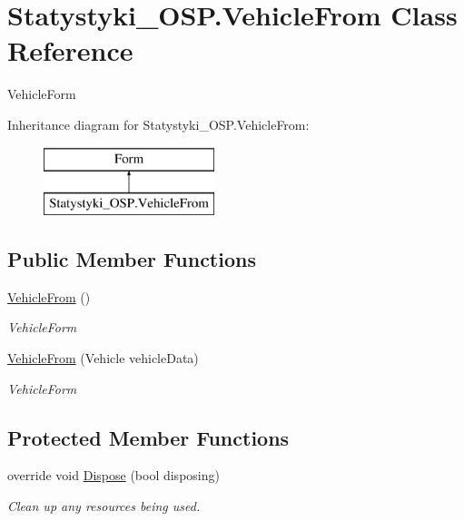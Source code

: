 \hypertarget{class_statystyki___o_s_p_1_1_vehicle_from}{}\section{Statystyki\+\_\+\+O\+S\+P.\+Vehicle\+From Class Reference}
\label{class_statystyki___o_s_p_1_1_vehicle_from}


Vehicle\+Form  


Inheritance diagram for Statystyki\+\_\+\+O\+S\+P.\+Vehicle\+From\+:\begin{figure}[H]
\begin{center}
\leavevmode
\includegraphics[height=2.000000cm]{class_statystyki___o_s_p_1_1_vehicle_from}
\end{center}
\end{figure}
\subsection*{Public Member Functions}
\begin{DoxyCompactItemize}
\item 
\mbox{\hyperlink{class_statystyki___o_s_p_1_1_vehicle_from_a5873dd3f6c9ede7042a142ee79314c68}{Vehicle\+From}} ()
\begin{DoxyCompactList}\small\item\em Vehicle\+Form \end{DoxyCompactList}\item 
\mbox{\hyperlink{class_statystyki___o_s_p_1_1_vehicle_from_a78a33047a3fbb0f70140f1406dafb10a}{Vehicle\+From}} (Vehicle vehicle\+Data)
\begin{DoxyCompactList}\small\item\em Vehicle\+Form \end{DoxyCompactList}\end{DoxyCompactItemize}
\subsection*{Protected Member Functions}
\begin{DoxyCompactItemize}
\item 
override void \mbox{\hyperlink{class_statystyki___o_s_p_1_1_vehicle_from_ac2cb5de1e458cfaac3f8a1644bc1437c}{Dispose}} (bool disposing)
\begin{DoxyCompactList}\small\item\em Clean up any resources being used. \end{DoxyCompactList}\end{DoxyCompactItemize}
